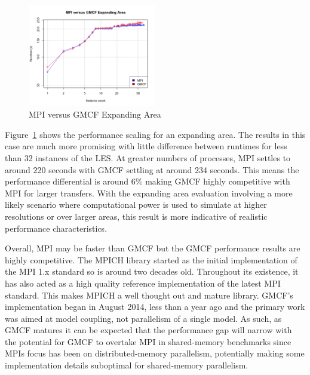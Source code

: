 \begin{figure}
    \includegraphics[width=0.5\textwidth]{graphs/GMCF-MPI-expanding-area.png}
    \caption{MPI versus GMCF Expanding Area}
    \label{fig:gmcfmpiexpandingarea}
\end{figure}

Figure~\ref{fig:gmcfmpiexpandingarea} shows the performance scaling for an
expanding area. The results in this case are much more promising with little
difference between runtimes for less than 32 instances of the LES. At greater
numbers of processes, MPI settles to around 220 seconds with GMCF settling at
around 234 seconds. This means the performance differential is around 6\% making
GMCF highly competitive with MPI for larger transfers. With the expanding area
evaluation involving a more likely scenario where computational power is used to
simulate at higher resolutions or over larger areas, this result is more
indicative of realistic performance characteristics.

Overall, MPI may be faster than GMCF but the GMCF performance results are highly
competitive. The MPICH library started as the initial implementation of the MPI
1.x standard so is around two decades old. Throughout its existence, it has also
acted as a high quality reference implementation of the latest MPI standard.
This makes MPICH a well thought out and mature library. GMCF's implementation
began in August 2014, less than a year ago and the primary work was aimed at
model coupling, not parallelism of a single model. As such, as GMCF matures it
can be expected that the performance gap will narrow with the potential for GMCF
to overtake MPI in shared-memory benchmarks since MPIs focus has been on
distributed-memory parallelism, potentially making some implementation details
suboptimal for shared-memory parallelism.
